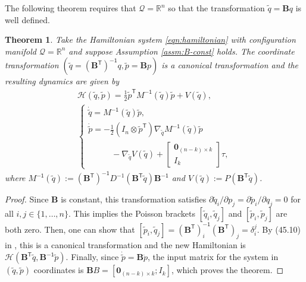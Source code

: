 \documentclass[journal,twoside,web, twocolumn,draftcls]{ieeecolor}
\newtheorem{thm}{Theorem}%
\newcommand*{\tpose}{^\mathsf{T}}
\newcommand*{\inv}{^\mathsf{-1}}
\newcommand*{\R}{\mathbb{R}}
\newcommand*{\Minv}{M^\mathsf{-1}}
\newcommand*{\Id}[1]{I_{#1}}
\newcommand*{\Zmat}[1]{\bm{0}_{#1}}
\newcommand*{\simpleB}{\begin{bmatrix}\Zmat{(n-k)\times k}\\ \Id{k}\end{bmatrix}}
\begin{document}
The following theorem requires that \(\mathcal{Q} = \R^n\) so that the
transformation \(\tilde{q} = \mathbf{B}q\) is well defined.

\begin{thm}\label{thm:simply-actuated}
    Take the Hamiltonian system \eqref{eqn:hamiltonian} with configuration
    manifold \(\mathcal{Q} = \R^n\) and suppose
    Assumption \ref{assm:B-const} holds.
    The coordinate transformation
    \(\left(\tilde{q} = (\mathbf{B}\tpose)\inv q, \tilde{p} = \mathbf{B}p\right)\)
    is a canonical transformation and the resulting dynamics are given by 
    \begin{gather}\label{eqn:simple-hamiltonian}
        \mathcal{H}(\tilde{q},\tilde{p}) = 
        \frac{1}{2} \tilde{p}\tpose \Minv(\tilde{q}) \tilde{p} + V(\tilde{q})
        , \\
       \begin{cases}
           \dot{\tilde{q}} = \Minv(\tilde{q})\tilde{p}
           , \\
           \dot{\tilde{p}} = -\frac{1}{2} (\Id{n} \otimes \tilde{p}\tpose)
           \nabla_{\tilde{q}} \Minv(\tilde{q}) \tilde{p} \\
           \phantom{---} - \nabla_{\tilde{q}} V(\tilde{q}) + \simpleB \tau
            ,
        \end{cases} \nonumber
    \end{gather}
    where 
    \(\Minv(\tilde{q}) := 
    (\mathbf{B}\tpose)\inv D^{-1}(\mathbf{B}\tpose \tilde{q})\mathbf{B}\inv\)
    and
    \(V(\tilde{q}) := P(\mathbf{B}\tpose \tilde{q})\).
\end{thm}
\begin{proof}
    Since \(\mathbf{B}\) is constant, this transformation satisfies
    \(\partial\tilde{q}_i/\partial p_j = \partial\tilde{p}_i/\partial q_j = 0\) for all 
    \(i,j \in \{1,\ldots,n\}\).
    This implies the Poisson brackets \([\tilde{q}_i, \tilde{q}_j]\)
    and \([\tilde{p}_i,\tilde{p}_j]\) are both zero.
    Then, one can show that
    \([\tilde{p}_i, \tilde{q}_j] = (\mathbf{B}\tpose)\inv_i (\mathbf{B}\tpose)_j
        = \delta_i^j\).
    By (45.10) in \cite{landau_mechanics}, this is a canonical transformation
    and the new Hamiltonian is
    \(\mathcal{H}(\mathbf{B}\tpose \tilde{q}, \mathbf{B}\inv \tilde{p})\).
    Finally, since \(\dot{\tilde{p}} = \mathbf{B} \dot{p}\), the input
    matrix for the system in \((\tilde{q},\tilde{p})\) coordinates is
    \(\mathbf{B}B = [\Zmat{(n-k)\times k}; \Id{k}]\), which proves the theorem.
\end{proof}
\end{document}
